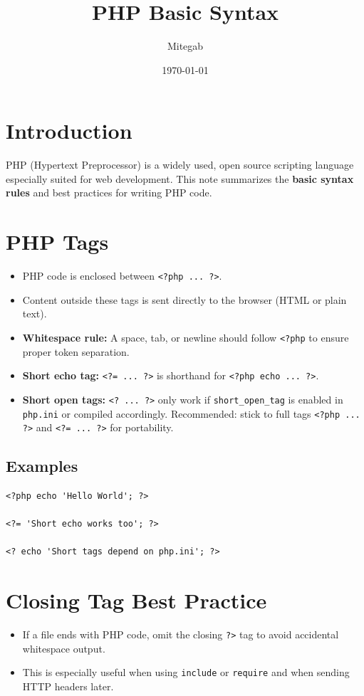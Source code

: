 \documentclass[12pt,a4paper]{article}
\title{\textbf{PHP Basic Syntax}}
\author{Mitegab}
\date{\today}
\begin{document}
\maketitle

\section*{Introduction}
PHP (Hypertext Preprocessor) is a widely used, open source scripting language especially suited for web development.  
This note summarizes the \textbf{basic syntax rules} and best practices for writing PHP code.

\section{PHP Tags}
\begin{itemize}[left=1em]
  \item PHP code is enclosed between \verb|<?php ... ?>|.
  \item Content outside these tags is sent directly to the browser (HTML or plain text).
  \item \textbf{Whitespace rule:} A space, tab, or newline should follow \verb|<?php| to ensure proper token separation.
  \item \textbf{Short echo tag:} \verb|<?= ... ?>| is shorthand for \verb|<?php echo ... ?>|.
  \item \textbf{Short open tags:} \verb|<? ... ?>| only work if \texttt{short\_open\_tag} is enabled in \texttt{php.ini} or compiled accordingly.  
        Recommended: stick to full tags \verb|<?php ... ?>| and \verb|<?= ... ?>| for portability.
\end{itemize}

\subsection*{Examples}
\begin{verbatim}
<?php echo 'Hello World'; ?>

<?= 'Short echo works too'; ?>

<? echo 'Short tags depend on php.ini'; ?>
\end{verbatim}

\section{Closing Tag Best Practice}
\begin{itemize}[left=1em]
  \item If a file ends with PHP code, omit the closing \verb|?>| tag to avoid accidental whitespace output.
  \item This is especially useful when using \texttt{include} or \texttt{require} and when sending HTTP headers later.
\end{itemize}
\end{document}
